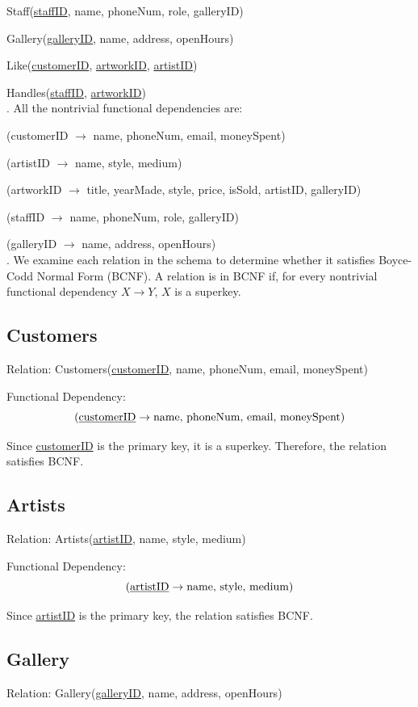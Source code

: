 \documentclass[12pt]{article}
\begin{document}
Staff(\underline{staffID}, name, phoneNum, role, galleryID)

Gallery(\underline{galleryID}, name, address, openHours)

Like(\underline{customerID}, \underline{artworkID}, \underline{artistID})

Handles(\underline{staffID}, \underline{artworkID}) \\

. All the nontrivial functional dependencies are:

(customerID $\rightarrow$ name, phoneNum, email, moneySpent)

(artistID $\rightarrow$ name, style, medium)

(artworkID $\rightarrow$ title, yearMade, style, price, isSold, artistID, galleryID)

(staffID $\rightarrow$ name, phoneNum, role, galleryID)

(galleryID $\rightarrow$ name, address, openHours)\\ 

. We examine each relation in the schema to determine whether it satisfies Boyce-Codd Normal Form (BCNF). A relation is in BCNF if, for every nontrivial functional dependency $X \rightarrow Y$, $X$ is a superkey.

\subsection*{Customers}
Relation: Customers(\underline{customerID}, name, phoneNum, email, moneySpent)

Functional Dependency:
\[
(\text{\underline{customerID}} \rightarrow \text{name, phoneNum, email, moneySpent})
\]

Since \underline{customerID} is the primary key, it is a superkey. Therefore, the relation satisfies BCNF.

\subsection*{Artists}
Relation: Artists(\underline{artistID}, name, style, medium)

Functional Dependency:
\[
(\text{\underline{artistID}} \rightarrow \text{name, style, medium})
\]

Since \underline{artistID} is the primary key, the relation satisfies BCNF.

\subsection*{Gallery}
Relation: Gallery(\underline{galleryID}, name, address, openHours)
\end{document}
